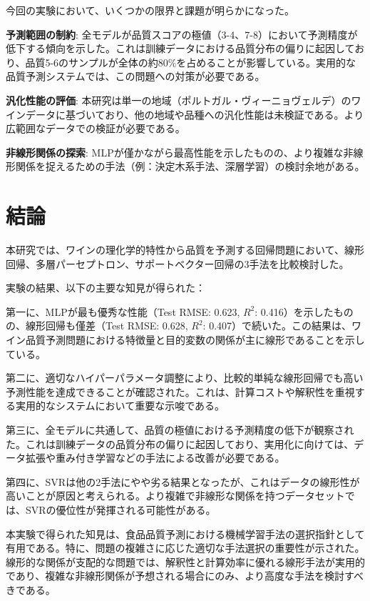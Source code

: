 \documentclass[12pt,a4paper,dvipdfmx]{jsarticle}
\begin{document}
今回の実験において、いくつかの限界と課題が明らかになった。

\textbf{予測範囲の制約}: 全モデルが品質スコアの極値（3-4、7-8）において予測精度が低下する傾向を示した。これは訓練データにおける品質分布の偏りに起因しており、品質5-6のサンプルが全体の約80\%を占めることが影響している。実用的な品質予測システムでは、この問題への対策が必要である。


\textbf{汎化性能の評価}: 本研究は単一の地域（ポルトガル・ヴィーニョヴェルデ）のワインデータに基づいており、他の地域や品種への汎化性能は未検証である。より広範囲なデータでの検証が必要である。

\textbf{非線形関係の探索}: MLPが僅かながら最高性能を示したものの、より複雑な非線形関係を捉えるための手法（例：決定木系手法、深層学習）の検討余地がある。


\section{結論}

本研究では、ワインの理化学的特性から品質を予測する回帰問題において、線形回帰、多層パーセプトロン、サポートベクター回帰の3手法を比較検討した。

実験の結果、以下の主要な知見が得られた：

第一に、MLPが最も優秀な性能（Test RMSE: 0.623, $R^2$: 0.416）を示したものの、線形回帰も僅差（Test RMSE: 0.628, $R^2$: 0.407）で続いた。この結果は、ワイン品質予測問題における特徴量と目的変数の関係が主に線形であることを示している。

第二に、適切なハイパーパラメータ調整により、比較的単純な線形回帰でも高い予測性能を達成できることが確認された。これは、計算コストや解釈性を重視する実用的なシステムにおいて重要な示唆である。

第三に、全モデルに共通して、品質の極値における予測精度の低下が観察された。これは訓練データの品質分布の偏りに起因しており、実用化に向けては、データ拡張や重み付き学習などの手法による改善が必要である。

第四に、SVRは他の2手法にやや劣る結果となったが、これはデータの線形性が高いことが原因と考えられる。より複雑で非線形な関係を持つデータセットでは、SVRの優位性が発揮される可能性がある。

本実験で得られた知見は、食品品質予測における機械学習手法の選択指針として有用である。特に、問題の複雑さに応じた適切な手法選択の重要性が示された。線形的な関係が支配的な問題では、解釈性と計算効率に優れる線形手法が実用的であり、複雑な非線形関係が予想される場合にのみ、より高度な手法を検討すべきである。
\end{document}
